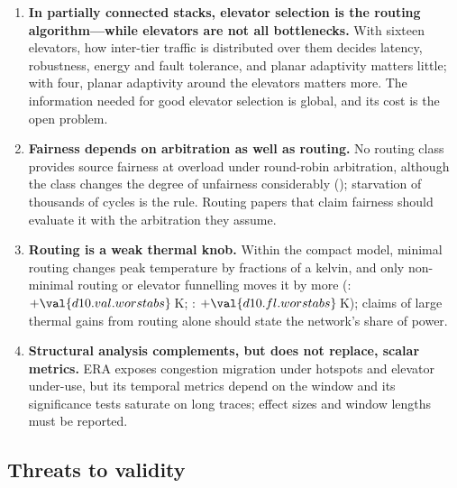 \begin{enumerate}[label=\textbf{L\arabic*.},leftmargin=*,itemsep=2pt]
\item \textbf{In partially connected stacks, elevator selection is the routing algorithm---while elevators are not all bottlenecks.} With sixteen elevators, how inter-tier traffic is distributed over them decides latency, robustness, energy and fault tolerance, and planar adaptivity matters little; with four, planar adaptivity around the elevators matters more. The information needed for good elevator selection is global, and its cost is the open problem.
\item \textbf{Fairness depends on arbitration as well as routing.} No routing class provides source fairness at overload under round-robin arbitration, although the class changes the degree of unfairness considerably (); starvation of thousands of cycles is the rule. Routing papers that claim fairness should evaluate it with the arbitration they assume.
\item \textbf{Routing is a weak thermal knob.} Within the compact model, minimal routing changes peak temperature by fractions of a kelvin, and only non-minimal routing or elevator funnelling moves it by more (: $+\val{d10.val.worstabs}$\,K; : $+\val{d10.fl.worstabs}$\,K); claims of large thermal gains from routing alone should state the network's share of power.
\item \textbf{Structural analysis complements, but does not replace, scalar metrics.} ERA exposes congestion migration under hotspots and elevator under-use, but its temporal metrics depend on the window and its significance tests saturate on long traces; effect sizes and window lengths must be reported.
\end{enumerate}

\subsection{Threats to validity}
\label{sec:threats}

